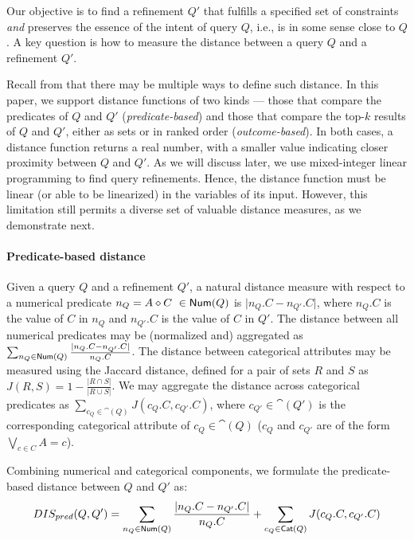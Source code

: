 Our objective is to find a refinement $Q'$ that fulfills a specified set of constraints \emph{and} preserves the essence of the intent of query $Q$, i.e., is in some sense close to $Q$. A key question is how to measure the distance between a query $Q$ and a refinement $Q'$. %

Recall from  that there may be multiple ways to define such distance. %
In this paper, we support distance functions of two kinds --- those that compare the predicates of $Q$ and $Q'$ (\emph{predicate-based}) and those that compare the top-$k$ results of $Q$ and $Q'$, either as sets or in ranked order (\emph{outcome-based}).  In both cases, a distance function returns a real number, with a smaller value indicating closer proximity between $Q$ and $Q'$.
As we will discuss later, we use mixed-integer linear programming to find query refinements. Hence, the distance function must be linear (or able to be linearized) in the variables of its input. However, this limitation still permits a diverse set of valuable distance measures, as we demonstrate next.



\paragraph*{\textbf{Predicate-based distance}}\sloppy
    Given a query $Q$ and a refinement $Q'$, a natural distance measure with respect to a numerical predicate $n_Q = A \diamond C~\in \textsf{Num}(Q)$ is $\vert n_Q.C - n_{Q'}.C \vert$, where $n_Q.C$ is the value of $C$ in $n_Q$ and $n_{Q'}.C$ is the value of $C$ in $Q'$. The distance between all numerical predicates may be (normalized and) aggregated as $\sum_{n_Q\in \textsf{Num}(Q)} \frac{\vert n_Q.C - n_{Q'}.C \vert}{n_Q.C}$.
     The distance between categorical attributes may be measured using the Jaccard distance, defined for a pair of sets $R$ and $S$ as $J(R, S) = 1 - \frac{|R \cap S|}{|R \cup S|}$. We may aggregate the distance across categorical predicates as $\sum_{c_Q \in \cat(Q)} J(c_Q.C, c_{Q'}.C)$, where $c_{Q'}\in \cat(Q')$ is the corresponding categorical attribute of $c_Q\in \cat(Q)$ ($c_Q$ and $c_{Q'}$ are of the form $\bigvee_{c \in C} A = c$). 
     
     Combining numerical and categorical components, we formulate the predicate-based distance between $Q$ and $Q'$ as: %
    $$DIS_{pred}(Q,Q')=\sum_{n_Q\in \textsf{Num}(Q)} \frac{\vert n_Q.C - n_{Q'}.C \vert}{n_Q.C}+ \sum_{c_Q \in \textsf{Cat}(Q)} J(c_Q.C, c_{Q'}.C)$$



